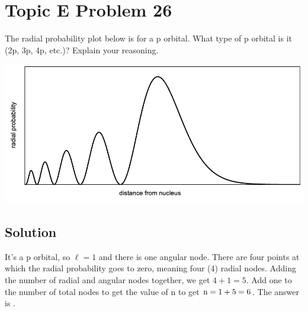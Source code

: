 \documentclass[10pt]{article}
\begin{document}
    \pagebreak
    \section{Topic E Problem 26}
        The radial probability plot below is for a p orbital. 
        What type of p orbital is it (2p, 3p, 4p, etc.)? 
        Explain your reasoning.
        \begin{center}
            \includegraphics[width=\textwidth]{img-E26.png}
        \end{center}

        \subsection{Solution}
            It's a p orbital, so $\ell = 1$ and there is one angular node.
            There are four points at which the radial probability goes to zero, meaning four (4) radial nodes.
            Adding the number of radial and angular nodes together, we get $4 + 1 = 5$.
            Add one to the number of total nodes to get the value of n to get $\rm n = 1 + 5 = 6$.
            The answer is .

    \pagebreak
\end{document}

